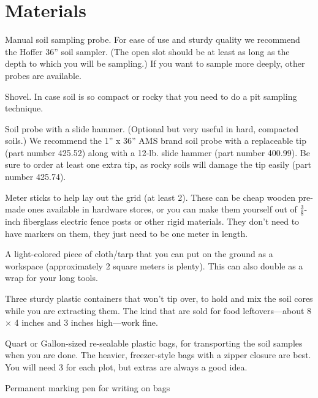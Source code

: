 \documentclass[11pt,letterpaper,twoside,onecolumn]{memoir}
\begin{document}
\section*{Materials}
\begin{checkboxlist}
\item Manual soil sampling probe. For ease of use and sturdy quality we recommend the Hoffer 36'' soil sampler. (The open slot should be at least as long as the depth to which you will be sampling.) If you want to sample more deeply, other probes are available.

\item Shovel. In case soil is so compact or rocky that you need to do a pit sampling technique. 

\item Soil probe with a slide hammer. (Optional but very useful in hard, compacted soils.) We recommend the 1'' x 36'' AMS brand soil probe with a replaceable tip (part number 425.52) along with a 12-lb. slide hammer (part number 400.99). Be sure to order at least one extra tip, as rocky soils will damage the tip easily (part number 425.74).  

\item Meter sticks to help lay out the grid (at least 2).  These can be cheap wooden pre-made ones available in hardware stores, or you can make them yourself out of $\frac{3}{8}$-inch fiberglass electric fence posts or other rigid materials. They don't need to have markers on them, they just need to be one meter in length. 

\item A light-colored piece of cloth/tarp that you can put on the ground as a workspace (approximately 2 square meters is plenty). This can also double as a wrap for your long tools.

\item Three sturdy plastic containers that won't tip over, to hold and mix the soil cores while you are extracting them. The kind that are sold for food leftovers---about 8 $\times $ 4 inches and 3 inches high---work fine.

\item Quart or Gallon-sized re-sealable plastic bags, for transporting the soil samples when you are done. The heavier, freezer-style bags with a zipper closure are best. You will need 3 for each plot, but extras are always a good idea.

\item Permanent marking pen for writing on bags


\end{checkboxlist}
\end{document}
